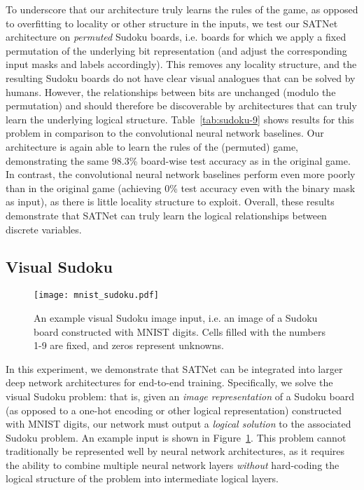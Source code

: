 \documentclass{article}
\begin{document}
	To underscore that our architecture truly learns the rules of the game, as opposed to overfitting to locality or other structure in the inputs, we test our SATNet architecture on \emph{permuted} Sudoku boards, i.e. boards for which we apply a fixed permutation of the underlying bit representation (and adjust the corresponding input masks and labels accordingly).
	This removes any locality structure, and the resulting Sudoku boards do not have clear visual analogues that can be solved by humans. However, the relationships between bits are unchanged (modulo the permutation) and should therefore be discoverable by architectures that can truly learn the underlying logical structure.
	Table~\ref{tab:sudoku-9} shows results for this problem in  comparison to the convolutional neural network baselines.
	Our architecture is again able to 
learn the rules of the (permuted) game, demonstrating the same 98.3\% board-wise test accuracy as in the original game.
	In contrast, the convolutional neural network baselines perform even more poorly than in the original game (achieving 0\% test accuracy even with the binary mask as input), as there is little locality structure to exploit.
	Overall, these results demonstrate that SATNet can truly learn the logical relationships between discrete variables.
	
	\subsection{Visual Sudoku}
	
	\begin{figure}[t]
		\centering
		\texttt{[image: mnist\_sudoku.pdf]}
		\caption{An example visual Sudoku image input, i.e. an image of a Sudoku board constructed with MNIST digits. Cells filled with the numbers 1-9 are fixed, and zeros represent unknowns.}
		\label{fig:mnist-sudoku-input}
	\end{figure}
	
	In this experiment, we demonstrate that SATNet can be integrated into larger deep network architectures for end-to-end training. 
Specifically, we solve the visual Sudoku problem: that is, given an \emph{image representation} of a Sudoku board (as opposed to a one-hot encoding or other logical representation) constructed with MNIST digits, our network must output a \emph{logical solution} to the associated Sudoku problem. 
	An example input is shown in Figure~\ref{fig:mnist-sudoku-input}.
	This problem cannot traditionally be represented well by neural network architectures, as it requires the ability to combine multiple neural network layers \emph{without} hard-coding 
the logical structure
	of the problem into intermediate logical layers.
	
\end{document}
